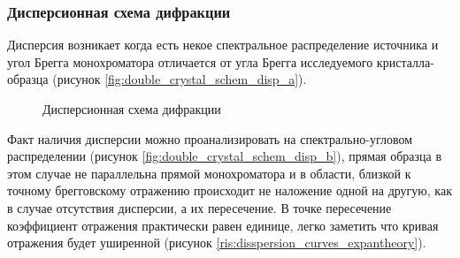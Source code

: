 \subsubsection{Дисперсионная схема дифракции}
  Дисперсия возникает когда есть некое спектральное распределение источника и
   угол Брегга монохроматора отличается от угла Брегга исследуемого кристалла-образца
   (рисунок \ref{fig:double_crystal_schem_disp_a}).
  \begin{figure}[H]
    \centering
    \hfill
    \caption{Дисперсионная схема дифракции}
    \label{ris:double_crystal_schem_disp}
  \end{figure}
  Факт наличия дисперсии можно проанализировать на спектрально-угловом распределении
  (рисунок \ref{fig:double_crystal_schem_disp_b}), прямая образца в этом случае не параллельна прямой монохроматора и
  в области, близкой к точному брегговскому отражению происходит не наложение одной на другую, как в случае отсутствия дисперсии,
  а их пересечение. В точке пересечение коэффициент отражения практически равен единице,
  легко заметить что кривая отражения будет уширенной (рисунок \ref{ris:disspersion_curves_expantheory}).
